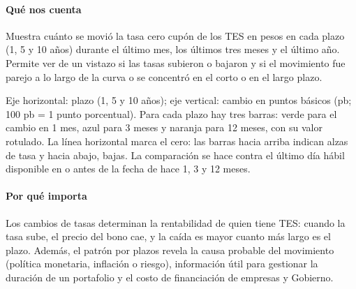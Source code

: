\paragraph{Qué nos cuenta}
Muestra cuánto se movió la tasa cero cupón de los TES en pesos en cada plazo (1, 5 y 10 años) durante el último mes, los últimos tres meses y el último año. Permite ver de un vistazo si las tasas subieron o bajaron y si el movimiento fue parejo a lo largo de la curva o se concentró en el corto o en el largo plazo.

\begin{leer}
Eje horizontal: plazo (1, 5 y 10 años); eje vertical: cambio en puntos básicos (pb; 100 pb = 1 punto porcentual). Para cada plazo hay tres barras: verde para el cambio en 1 mes, azul para 3 meses y naranja para 12 meses, con su valor rotulado. La línea horizontal marca el cero: las barras hacia arriba indican alzas de tasa y hacia abajo, bajas. La comparación se hace contra el último día hábil disponible en o antes de la fecha de hace 1, 3 y 12 meses.
\end{leer}

\paragraph{Por qué importa}
Los cambios de tasas determinan la rentabilidad de quien tiene TES: cuando la tasa sube, el precio del bono cae, y la caída es mayor cuanto más largo es el plazo. Además, el patrón por plazos revela la causa probable del movimiento (política monetaria, inflación o riesgo), información útil para gestionar la duración de un portafolio y el costo de financiación de empresas y Gobierno.

